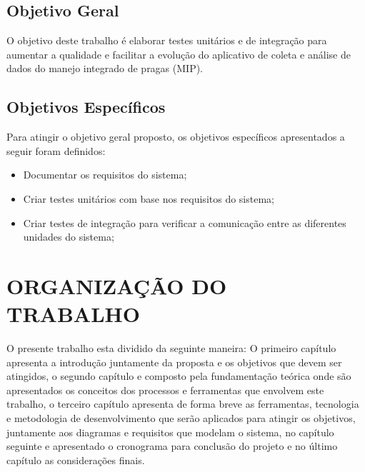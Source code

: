 \subsection{Objetivo Geral}

O objetivo deste trabalho é elaborar testes unitários e de integração para aumentar a qualidade e facilitar a evolução do aplicativo de coleta e análise de dados do manejo integrado de pragas (MIP). 


\subsection{Objetivos Específicos}

Para atingir o objetivo geral proposto, os objetivos específicos
apresentados a seguir foram definidos:



\begin{itemize}
\item Documentar os requisitos do sistema; 
 
\item Criar testes unitários com base nos requisitos do sistema;

\item Criar testes de integração para verificar a comunicação entre as diferentes unidades do sistema;


\end{itemize}

\section{ORGANIZAÇÃO DO TRABALHO}

O presente trabalho esta dividido da seguinte maneira: O primeiro capítulo apresenta a introdução juntamente da proposta e os objetivos que devem ser atingidos, o segundo capítulo e composto pela fundamentação teórica onde são apresentados os conceitos dos processos e ferramentas que envolvem este trabalho, o terceiro capítulo apresenta de forma breve as ferramentas, tecnologia e metodologia de desenvolvimento que serão aplicados para atingir os objetivos, juntamente aos diagramas e requisitos que modelam o sistema, no capítulo seguinte e apresentado o cronograma para conclusão do projeto e no último capítulo as considerações finais.   
